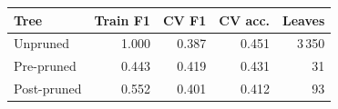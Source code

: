 \begin{tabular}{@{}lrrrr@{}}
\toprule
Tree & Train F1 & CV F1 & CV acc. & Leaves \\
\midrule
Unpruned & 1.000 & 0.387 & 0.451 & 3\,350 \\
Pre-pruned & 0.443 & 0.419 & 0.431 & 31 \\
Post-pruned & 0.552 & 0.401 & 0.412 & 93 \\
\bottomrule
\end{tabular}
